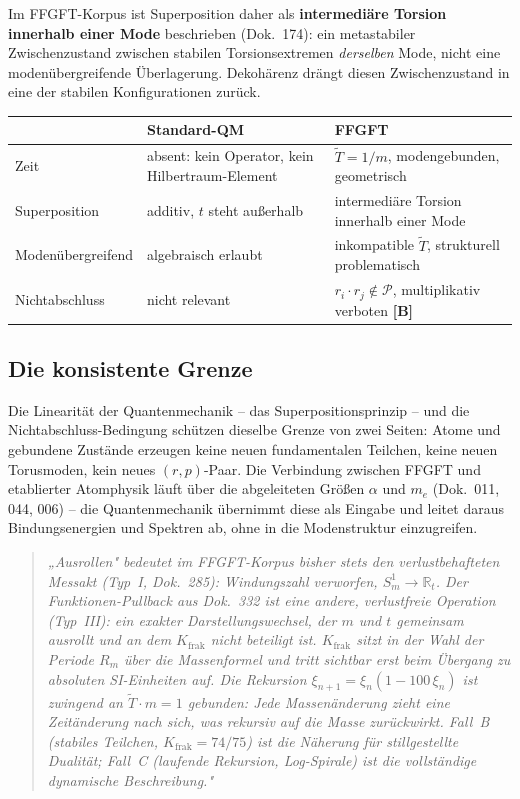 Im FFGFT-Korpus ist Superposition daher als
\textbf{intermediäre Torsion innerhalb einer Mode} beschrieben
(Dok.~174): ein metastabiler Zwischenzustand zwischen stabilen
Torsionsextremen \emph{derselben} Mode, nicht eine
modenübergreifende Überlagerung. Dekohärenz drängt diesen
Zwischenzustand in eine der stabilen Konfigurationen zurück.

\begin{center}
\begin{tabular}{lp{4.2cm}p{4.2cm}}
\toprule
 & \textbf{Standard-QM} & \textbf{FFGFT} \\
\midrule
Zeit & absent: kein Operator, kein Hilbertraum-Element & $\tilde{T}=1/m$, modengebunden, geometrisch \\
Superposition & additiv, $t$ steht außerhalb & intermediäre Torsion
  innerhalb einer Mode \\
Modenübergreifend & algebraisch erlaubt & inkompatible $\tilde{T}$,
  strukturell problematisch \\
Nichtabschluss & nicht relevant & $r_i\cdot r_j\notin\mathcal{P}$,
  multiplikativ verboten \textbf{[B]} \\
\bottomrule
\end{tabular}
\end{center}

\subsection{Die konsistente Grenze}

Die Linearität der Quantenmechanik -- das Superpositionsprinzip --
und die Nichtabschluss-Bedingung schützen dieselbe Grenze von zwei
Seiten: Atome und gebundene Zustände erzeugen keine neuen
fundamentalen Teilchen, keine neuen Torusmoden, kein neues
$(r,p)$-Paar. Die Verbindung zwischen FFGFT und etablierter
Atomphysik läuft über die abgeleiteten Größen $\alpha$ und $m_e$
(Dok.~011, 044, 006) -- die Quantenmechanik übernimmt diese als
Eingabe und leitet daraus Bindungsenergien und Spektren ab, ohne
in die Modenstruktur einzugreifen.

\begin{quote}
\emph{„Ausrollen" bedeutet im FFGFT-Korpus bisher stets den
verlustbehafteten Messakt (Typ~I, Dok.~285): Windungszahl verworfen,
$S^1_m\to\mathbb{R}_t$. Der Funktionen-Pullback aus Dok.~332 ist eine
andere, verlustfreie Operation (Typ~III): ein exakter
Darstellungswechsel, der $m$ und $t$ gemeinsam ausrollt und an dem
$K_{\text{frak}}$ nicht beteiligt ist. $K_{\text{frak}}$ sitzt in der
Wahl der Periode $R_m$ über die Massenformel und tritt sichtbar erst
beim Übergang zu absoluten SI-Einheiten auf. Die Rekursion
$\xi_{n+1}=\xi_n(1-100\,\xi_n)$ ist zwingend an $\tilde{T}\cdot m=1$
gebunden: Jede Massenänderung zieht eine Zeitänderung nach sich, was
rekursiv auf die Masse zurückwirkt. Fall~B (stabiles Teilchen,
$K_{\text{frak}}=74/75$) ist die Näherung für stillgestellte Dualität;
Fall~C (laufende Rekursion, Log-Spirale) ist die vollständige
dynamische Beschreibung."}
\end{quote}

